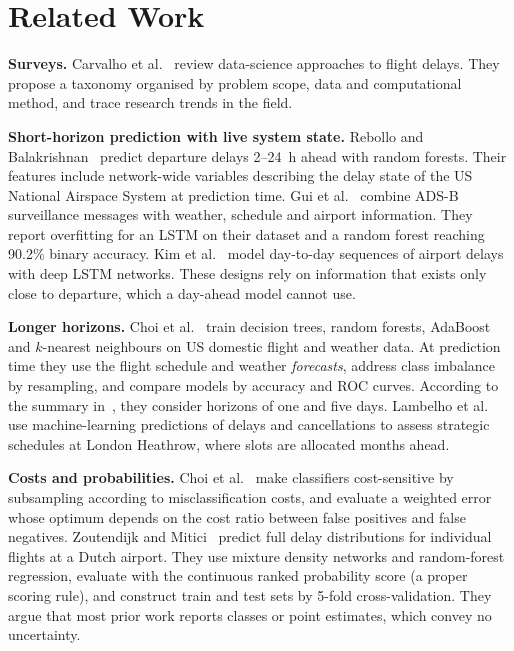 \documentclass[conference]{IEEEtran}
\begin{document}
\section{Related Work}\label{sec:related}
\textbf{Surveys.} Carvalho et al.~\cite{carvalho2021} review data-science approaches to flight
delays. They propose a taxonomy organised by problem scope, data and computational method, and
trace research trends in the field.

\textbf{Short-horizon prediction with live system state.} Rebollo and
Balakrishnan~\cite{rebollo2014} predict departure delays 2--24~h ahead with random forests. Their
features include network-wide variables describing the delay state of the US National Airspace
System at prediction time. Gui et al.~\cite{gui2020} combine ADS-B surveillance messages with
weather, schedule and airport information. They report overfitting for an LSTM on their dataset and
a random forest reaching 90.2\% binary accuracy. Kim et al.~\cite{kim2016} model day-to-day
sequences of airport delays with deep LSTM networks. These designs rely on information that exists
only close to departure, which a day-ahead model cannot use.

\textbf{Longer horizons.} Choi et al.~\cite{choi2016} train decision trees, random forests,
AdaBoost and $k$-nearest neighbours on US domestic flight and weather data. At prediction time they
use the flight schedule and weather \emph{forecasts}, address class imbalance by resampling, and
compare models by accuracy and ROC curves. According to the summary in~\cite{zoutendijk2021}, they
consider horizons of one and five days. Lambelho et al.~\cite{lambelho2020} use machine-learning
predictions of delays and cancellations to assess strategic schedules at London Heathrow, where
slots are allocated months ahead.

\textbf{Costs and probabilities.} Choi et al.~\cite{choi2017} make classifiers cost-sensitive by
subsampling according to misclassification costs, and evaluate a weighted error whose optimum
depends on the cost ratio between false positives and false negatives. Zoutendijk and
Mitici~\cite{zoutendijk2021} predict full delay distributions for individual flights at a Dutch
airport. They use mixture density networks and random-forest regression, evaluate with the
continuous ranked probability score (a proper scoring rule), and construct train and test sets by
5-fold cross-validation. They argue that most prior work reports classes or point estimates,
which convey no uncertainty.
\end{document}

